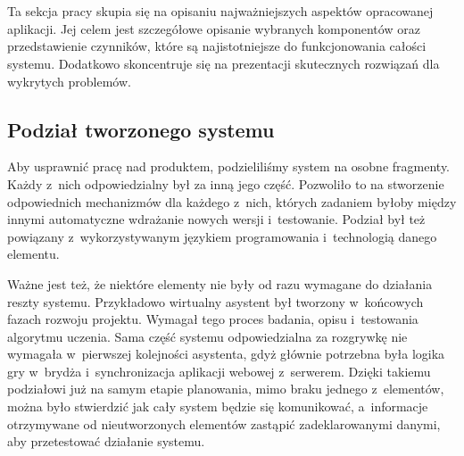 \chapter{\ChapterTitleRealizationAspects}
\label{sec:wybrane-aspekty-realizacji}

Ta sekcja pracy skupia się na opisaniu najważniejszych aspektów
opracowanej aplikacji.
Jej celem jest szczegółowe opisanie wybranych
komponentów oraz przedstawienie czynników, które są najistotniejsze do
funkcjonowania całości systemu. Dodatkowo skoncentruje
się na prezentacji skutecznych rozwiązań dla wykrytych problemów.

\section{Podział tworzonego systemu}

Aby usprawnić pracę nad produktem, podzieliliśmy system na osobne
fragmenty. Każdy z~nich odpowiedzialny był za inną jego część.
Pozwoliło to na stworzenie odpowiednich mechanizmów dla każdego
z~nich, których zadaniem byłoby między innymi automatyczne
wdrażanie nowych wersji i~testowanie. Podział był też powiązany
z~wykorzystywanym językiem programowania i~technologią danego elementu.

Ważne jest też, że niektóre elementy nie były od razu wymagane do
działania reszty systemu. Przykładowo wirtualny asystent był tworzony
w~końcowych fazach rozwoju projektu. Wymagał tego proces
badania, opisu i~testowania algorytmu uczenia. Sama część systemu
odpowiedzialna za rozgrywkę nie wymagała w~pierwszej kolejności
asystenta, gdyż głównie potrzebna była logika gry w~brydża
i~synchronizacja aplikacji webowej z~serwerem. Dzięki takiemu
podziałowi już na samym etapie planowania, mimo braku jednego
z~elementów, można było stwierdzić jak cały system będzie się
komunikować, a~informacje otrzymywane od nieutworzonych
elementów zastąpić zadeklarowanymi danymi, aby przetestować
działanie systemu. \\

